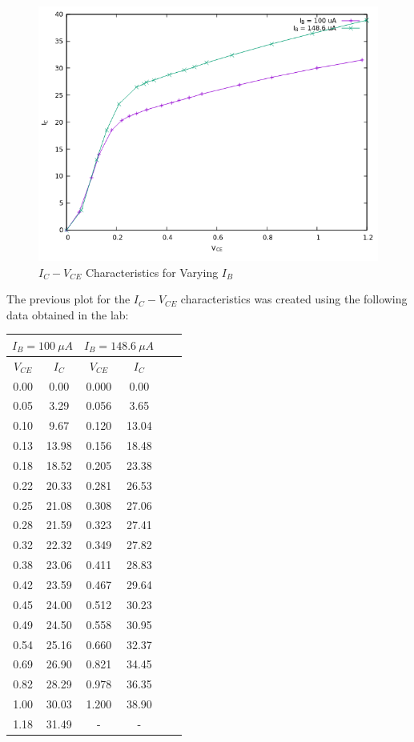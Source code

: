 \documentclass[12pt]{article}
\begin{document}
\begin{figure}[H]
	\centering
	\includegraphics[width = 0.63\linewidth, trim = {0 0 0 0}, clip]{Part1.png}
	\caption{\( I_C-V_{CE} \) Characteristics for Varying \( I_B \)}
\end{figure}
The previous plot for the \( I_C-V_{CE} \) characteristics was created using the following data obtained in the lab:
\begin{center}
 \begin{tabular}{|| c | c | c | c | c | c ||} 
 \hline
 \hline
 \multicolumn{2}{||c|}{\( I_B = 100\ \mu A \)} & \multicolumn{2}{c||}{\( I_B = 148.6\ \mu A \)} \\
 \hline
 \hline
\( V_{CE} \) & \( I_{C} \) & \( V_{CE} \) & \( I_{C} \) \\ [0.25ex] 
 \hline\hline
 \hline 
0.00 & 0.00 & 0.000 & 0.00 \\ \hline
0.05 & 3.29 & 0.056 & 3.65 \\ \hline
0.10 & 9.67 & 0.120 & 13.04 \\ \hline
0.13 & 13.98 & 0.156 & 18.48 \\ \hline
0.18 & 18.52 & 0.205 & 23.38 \\ \hline
0.22 & 20.33 & 0.281 & 26.53 \\ \hline
0.25 & 21.08 & 0.308 & 27.06 \\ \hline
0.28 & 21.59 & 0.323 & 27.41 \\ \hline
0.32 & 22.32 & 0.349 & 27.82 \\ \hline
0.38 & 23.06 & 0.411 & 28.83 \\ \hline
0.42 & 23.59 & 0.467 & 29.64 \\ \hline
0.45 & 24.00 & 0.512 & 30.23 \\ \hline
0.49 & 24.50 & 0.558 & 30.95 \\ \hline
0.54 & 25.16 & 0.660 & 32.37 \\ \hline
0.69 & 26.90 & 0.821 & 34.45 \\ \hline
0.82 & 28.29 & 0.978 & 36.35 \\ \hline
1.00 & 30.03 & 1.200 & 38.90 \\ \hline
1.18 & 31.49 &  -  &  -  \\ \hline
\end{tabular}
\end{center}
\end{document}
